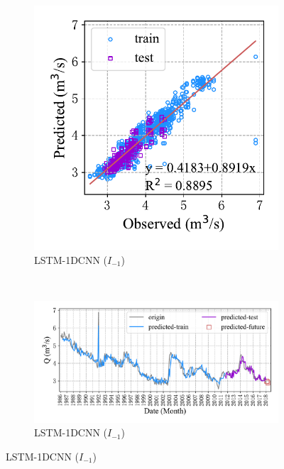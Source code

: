\begin{figure}[!htbp]
  \centering
  \begin{subfigure}[b]{0.305\textwidth}
    \includegraphics[width=\textwidth]{Img/chap4_spr/spr_scatter_in_1_out_3_lstm_cnn.pdf}
    \vspace{-1.2cm}
    \caption{LSTM-1DCNN ($I_{-1}$)}
    \label{fig:spr_scatter_in_1_out_3_lstm_cnn}
  \end{subfigure}
  ~
  \begin{subfigure}[b]{0.615\textwidth}
    \includegraphics[width=\textwidth]{Img/chap4_spr/spr_series_in_1_out_3_lstm_cnn.pdf}
    \vspace{-1.2cm}
    \caption{LSTM-1DCNN ($I_{-1}$)}
    \label{fig:spr_series_in_1_out_3_lstm_cnn}

\end{subfigure}
\end{figure}
